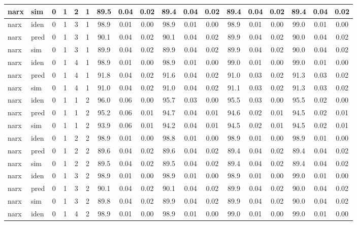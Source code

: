 \begin{landscape}
\begin{center}
\begin{longtable}{ll|cccc|ccc|ccc|ccc|ccc}
narx & sim  & 0 & 1 & 2 & 1 & 89.5 & 0.04 & 0.02 & 89.4 & 0.04 & 0.02 & 89.4 & 0.04 & 0.02 & 89.4 & 0.04 & 0.02 \\ 
 \hline 
narx & iden & 0 & 1 & 3 & 1 & 98.9 & 0.01 & 0.00 & 98.9 & 0.01 & 0.00 & 98.9 & 0.01 & 0.00 & 99.0 & 0.01 & 0.00 \\ 
narx & pred & 0 & 1 & 3 & 1 & 90.1 & 0.04 & 0.02 & 90.1 & 0.04 & 0.02 & 89.9 & 0.04 & 0.02 & 90.0 & 0.04 & 0.02 \\ 
narx & sim  & 0 & 1 & 3 & 1 & 89.9 & 0.04 & 0.02 & 89.9 & 0.04 & 0.02 & 89.9 & 0.04 & 0.02 & 90.0 & 0.04 & 0.02 \\ 
 \hline 
narx & iden & 0 & 1 & 4 & 1 & 98.9 & 0.01 & 0.00 & 98.9 & 0.01 & 0.00 & 99.0 & 0.01 & 0.00 & 99.0 & 0.01 & 0.00 \\ 
narx & pred & 0 & 1 & 4 & 1 & 91.8 & 0.04 & 0.02 & 91.6 & 0.04 & 0.02 & 91.0 & 0.03 & 0.02 & 91.3 & 0.03 & 0.02 \\ 
narx & sim  & 0 & 1 & 4 & 1 & 91.0 & 0.04 & 0.02 & 91.0 & 0.04 & 0.02 & 91.1 & 0.03 & 0.02 & 91.3 & 0.03 & 0.02 \\ 
 \hline 
narx & iden & 0 & 1 & 1 & 2 & 96.0 & 0.06 & 0.00 & 95.7 & 0.03 & 0.00 & 95.5 & 0.03 & 0.00 & 95.5 & 0.02 & 0.00 \\ 
narx & pred & 0 & 1 & 1 & 2 & 95.2 & 0.06 & 0.01 & 94.7 & 0.04 & 0.01 & 94.6 & 0.02 & 0.01 & 94.5 & 0.02 & 0.01 \\ 
narx & sim  & 0 & 1 & 1 & 2 & 93.9 & 0.06 & 0.01 & 94.2 & 0.04 & 0.01 & 94.5 & 0.02 & 0.01 & 94.5 & 0.02 & 0.01 \\ 
 \hline 
narx & iden & 0 & 1 & 2 & 2 & 98.9 & 0.01 & 0.00 & 98.8 & 0.01 & 0.00 & 98.9 & 0.01 & 0.00 & 98.9 & 0.01 & 0.00 \\ 
narx & pred & 0 & 1 & 2 & 2 & 89.6 & 0.04 & 0.02 & 89.6 & 0.04 & 0.02 & 89.4 & 0.04 & 0.02 & 89.4 & 0.04 & 0.02 \\ 
narx & sim  & 0 & 1 & 2 & 2 & 89.5 & 0.04 & 0.02 & 89.5 & 0.04 & 0.02 & 89.4 & 0.04 & 0.02 & 89.4 & 0.04 & 0.02 \\ 
 \hline 
narx & iden & 0 & 1 & 3 & 2 & 98.9 & 0.01 & 0.00 & 98.9 & 0.01 & 0.00 & 98.9 & 0.01 & 0.00 & 99.0 & 0.01 & 0.00 \\ 
narx & pred & 0 & 1 & 3 & 2 & 90.1 & 0.04 & 0.02 & 90.1 & 0.04 & 0.02 & 89.9 & 0.04 & 0.02 & 90.0 & 0.04 & 0.02 \\ 
narx & sim  & 0 & 1 & 3 & 2 & 89.8 & 0.04 & 0.02 & 89.9 & 0.04 & 0.02 & 89.9 & 0.04 & 0.02 & 90.0 & 0.04 & 0.02 \\ 
 \hline 
narx & iden & 0 & 1 & 4 & 2 & 98.9 & 0.01 & 0.00 & 98.9 & 0.01 & 0.00 & 99.0 & 0.01 & 0.00 & 99.0 & 0.01 & 0.00 \\ 

\end{longtable}
\end{center}
\end{landscape}
